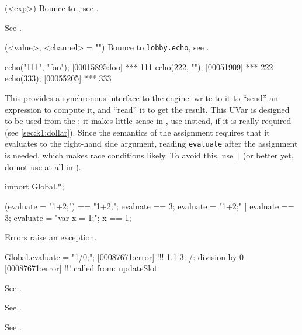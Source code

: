 \begin{urbiscriptapi}
\item[disown](<exp>)%
  Bounce to , see .


\item[Duration] See .


\item[echo](<value>, <channel> = "")%
  Bounce to \lstinline|lobby.echo|, see .
\begin{urbiscript}
echo("111", "foo");
[00015895:foo] *** 111
echo(222, "");
[00051909] *** 222
echo(333);
[00055205] *** 333
\end{urbiscript}


\item[evaluate] This  provides a synchronous interface to
  the \urbi engine: write to it to ``send'' an expression to compute it, and
  ``read'' it to get the result.  This UVar is designed to be used from the
  \Cxx; it makes little sense in \us, use  instead, if
  it is really required (see \autoref{sec:k1:dollar}).  Since the semantics
  of the assignment requires that it evaluates to the right-hand side
  argument, reading \lstinline|evaluate| after the assignment is needed,
  which makes race conditions likely.  To avoid this, use \lstinline{|} (or
  better yet, do not use  at all in \us).

\begin{urbiscript}
import Global.*;
\end{urbiscript}

\begin{urbiassert}
(evaluate = "1+2;") == "1+2;";
 evaluate == 3;
{ evaluate = "1+2;" | evaluate } == 3;
{ evaluate = "var x = 1;"; x } == 1;
\end{urbiassert}

  Errors raise an exception.

\begin{urbiscript}
Global.evaluate = "1/0;";
[00087671:error] !!! 1.1-3: /: division by 0
[00087671:error] !!!    called from: updateSlot
\end{urbiscript}


\item[Event] See .


\item[Exception] See .


\item[Executable] See .



\end{urbiscriptapi}
